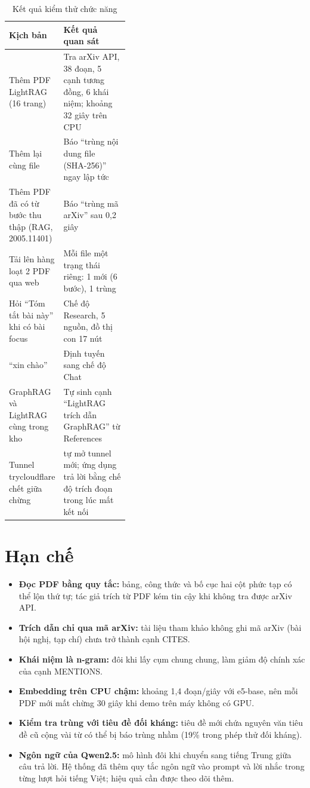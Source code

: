 \begin{table}[H]
\centering\small{}
\begin{tabularx}{\linewidth}{@{}P{0.4\linewidth}L@{}}
\toprule
\textbf{Kịch bản} & \textbf{Kết quả quan sát}\\
\midrule
Thêm PDF LightRAG (16 trang) & Tra arXiv API, 38 đoạn, 5 cạnh tương đồng, 6 khái niệm; khoảng 32 giây trên CPU\\
Thêm lại cùng file & Báo ``trùng nội dung file (SHA-256)'' ngay lập tức\\
Thêm PDF đã có từ bước thu thập (RAG, 2005.11401) & Báo ``trùng mã arXiv'' sau 0,2 giây\\
Tải lên hàng loạt 2 PDF qua web & Mỗi file một trạng thái riêng: 1 mới (6 bước), 1 trùng\\
Hỏi ``Tóm tắt bài này'' khi có bài focus & Chế độ Research, 5 nguồn, đồ thị con 17 nút\\
``xin chào'' & Định tuyến sang chế độ Chat\\
GraphRAG và LightRAG cùng trong kho & Tự sinh cạnh ``LightRAG trích dẫn GraphRAG'' từ References\\
Tunnel trycloudflare chết giữa chừng &  tự mở tunnel mới; ứng dụng trả lời bằng chế độ trích đoạn trong lúc mất kết nối\\
\bottomrule
\end{tabularx}
\caption{Kết quả kiểm thử chức năng}\label{tab:kiemthu}
\end{table}

\section{Hạn chế}

\begin{itemize}
\item \textbf{Đọc PDF bằng quy tắc:} bảng, công thức và bố cục hai cột phức tạp có thể lộn thứ tự; tác giả trích
  từ PDF kém tin cậy khi không tra được arXiv API.
\item \textbf{Trích dẫn chỉ qua mã arXiv:} tài liệu tham khảo không ghi mã arXiv (bài hội nghị, tạp chí) chưa trở
  thành cạnh CITES.
\item \textbf{Khái niệm là n-gram:} đôi khi lấy cụm chung chung, làm giảm độ chính xác của cạnh MENTIONS.
\item \textbf{Embedding trên CPU chậm:} khoảng 1,4 đoạn/giây với e5-base, nên mỗi PDF mới mất chừng 30 giây khi
  demo trên máy không có GPU.
\item \textbf{Kiểm tra trùng với tiêu đề đối kháng:} tiêu đề mới chứa nguyên văn tiêu đề cũ cộng vài từ có thể bị
  báo trùng nhầm (19\% trong phép thử đối kháng).
\item \textbf{Ngôn ngữ của Qwen2.5:} mô hình đôi khi chuyển sang tiếng Trung giữa câu trả lời. Hệ thống đã thêm
  quy tắc ngôn ngữ vào prompt và lời nhắc trong từng lượt hỏi tiếng Việt; hiệu quả cần được theo dõi thêm.
\end{itemize}
